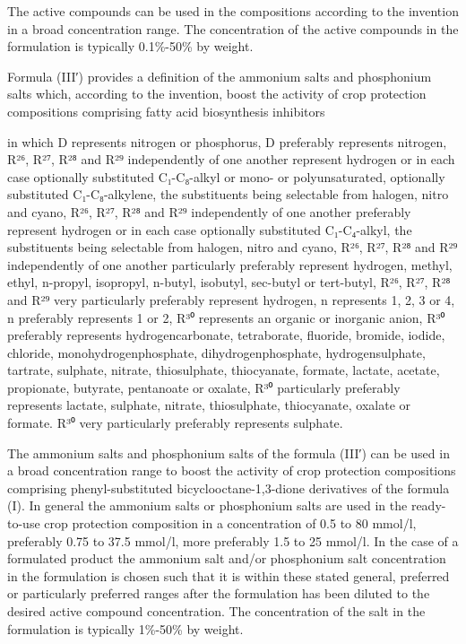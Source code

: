 \documentclass[11pt,a4paper]{article}
\begin{document}
The active compounds can be used in the compositions according to the invention in a broad concentration range. The concentration of the active compounds in the formulation is typically 0.1\%-50\% by weight.

Formula (III′) provides a definition of the ammonium salts and phosphonium salts which, according to the invention, boost the activity of crop protection compositions comprising fatty acid biosynthesis inhibitors

in which D represents nitrogen or phosphorus, D preferably represents nitrogen, R²⁶, R²⁷, R²⁸ and R²⁹ independently of one another represent hydrogen or in each case optionally substituted C₁-C₈-alkyl or mono- or polyunsaturated, optionally substituted C₁-C₈-alkylene, the substituents being selectable from halogen, nitro and cyano, R²⁶, R²⁷, R²⁸ and R²⁹ independently of one another preferably represent hydrogen or in each case optionally substituted C₁-C₄-alkyl, the substituents being selectable from halogen, nitro and cyano, R²⁶, R²⁷, R²⁸ and R²⁹ independently of one another particularly preferably represent hydrogen, methyl, ethyl, n-propyl, isopropyl, n-butyl, isobutyl, sec-butyl or tert-butyl, R²⁶, R²⁷, R²⁸ and R²⁹ very particularly preferably represent hydrogen, n represents 1, 2, 3 or 4, n preferably represents 1 or 2, R³⁰ represents an organic or inorganic anion, R³⁰ preferably represents hydrogencarbonate, tetraborate, fluoride, bromide, iodide, chloride, monohydrogenphosphate, dihydrogenphosphate, hydrogensulphate, tartrate, sulphate, nitrate, thiosulphate, thiocyanate, formate, lactate, acetate, propionate, butyrate, pentanoate or oxalate, R³⁰ particularly preferably represents lactate, sulphate, nitrate, thiosulphate, thiocyanate, oxalate or formate. R³⁰ very particularly preferably represents sulphate.

The ammonium salts and phosphonium salts of the formula (III′) can be used in a broad concentration range to boost the activity of crop protection compositions comprising phenyl-substituted bicyclooctane-1,3-dione derivatives of the formula (I). In general the ammonium salts or phosphonium salts are used in the ready-to-use crop protection composition in a concentration of 0.5 to 80 mmol/l, preferably 0.75 to 37.5 mmol/l, more preferably 1.5 to 25 mmol/l. In the case of a formulated product the ammonium salt and/or phosphonium salt concentration in the formulation is chosen such that it is within these stated general, preferred or particularly preferred ranges after the formulation has been diluted to the desired active compound concentration. The concentration of the salt in the formulation is typically 1\%-50\% by weight.
\end{document}
